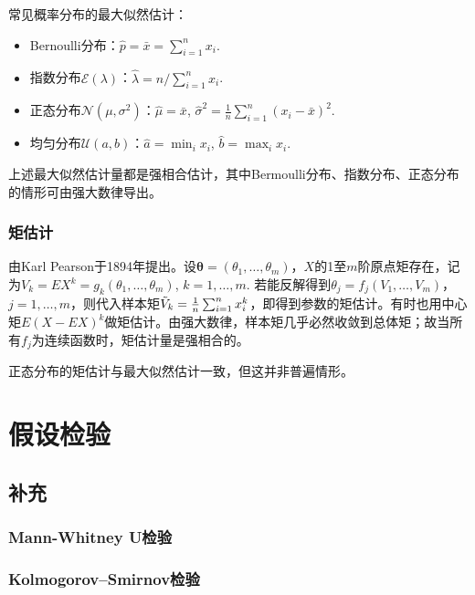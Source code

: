 \par 常见概率分布的最大似然估计：
\begin{itemize}
\item Bernoulli分布：$\hat{p}=\bar{x}=\sum_{i=1}^n x_i$.
\item 指数分布$\mathcal{E}(\lambda)$：$\hat{\lambda}=n/\sum_{i=1}^n x_i$.
\item 正态分布$\mathcal{N}(\mu,\sigma^2)$：$\hat{\mu}=\bar{x}$, $\hat{\sigma}^2=\frac{1}{n}\sum_{i=1}^n (x_i-\bar{x})^2$.
\item 均匀分布$\mathcal{U}(a,b)$：$\hat{a}=\min_i x_i$, $\hat{b}=\max_i x_i$.
\end{itemize}
上述最大似然估计量都是强相合估计，其中Bermoulli分布、指数分布、正态分布的情形可由强大数律导出。


\subsubsection{矩估计}

\par 由Karl Pearson于1894年提出。设$\boldsymbol{\theta}=(\theta_1,\dots,\theta_m)$，$X$的1至$m$阶原点矩存在，记为$V_k=EX^k=g_k(\theta_1,\dots,\theta_m)$, $k=1,\dots,m$. 若能反解得到$\theta_j=f_j(V_1,\dots,V_m)$，$j=1,\dots,m$，则代入样本矩$\Tilde{V}_k=\frac{1}{n}\sum_{i=1}^n x_i^k$，即得到参数的矩估计。有时也用中心矩$E(X-EX)^k$做矩估计。由强大数律，样本矩几乎必然收敛到总体矩；故当所有$f_j$为连续函数时，矩估计量是强相合的。

\par 正态分布的矩估计与最大似然估计一致，但这并非普遍情形。

\section{假设检验}

\subsection{补充}

\subsubsection{Mann-Whitney U检验}

\subsubsection{Kolmogorov–Smirnov检验}